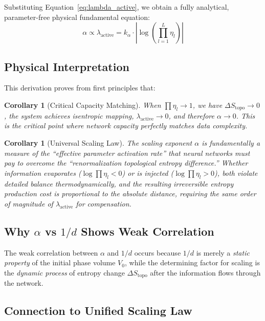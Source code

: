 \documentclass[11pt, a4paper]{article}
\newtheorem{coro}[theo]{Corollary}
\theoremstyle{plain}
\begin{document}
Substituting Equation~\eqref{eq:lambda_active}, we obtain a fully analytical, parameter-free physical fundamental equation:
\begin{equation}
\boxed{
\alpha \propto \lambda_{\text{active}} = k_\alpha \cdot \left| \log\left(\prod_{l=1}^{L} \eta_l\right) \right|
}
\end{equation}

\subsection{Physical Interpretation}

This derivation proves from first principles that:

\begin{coro}[Critical Capacity Matching]
When $\prod\eta_l \to 1$, we have $\Delta S_{\text{topo}} \to 0$, the system achieves isentropic mapping, $\lambda_{\text{active}} \to 0$, and therefore $\alpha \to 0$. This is the \emph{critical point} where network capacity perfectly matches data complexity.
\end{coro}

\begin{coro}[Universal Scaling Law]
The scaling exponent $\alpha$ is fundamentally a measure of the ``effective parameter activation rate'' that neural networks must pay to overcome the ``renormalization topological entropy difference.'' Whether information evaporates ($\log\prod\eta_l < 0$) or is injected ($\log\prod\eta_l > 0$), both violate detailed balance thermodynamically, and the resulting irreversible entropy production cost is proportional to the absolute distance, requiring the same order of magnitude of $\lambda_{\text{active}}$ for compensation.
\end{coro}

\subsection{Why $\alpha$ vs $1/d$ Shows Weak Correlation}

The weak correlation between $\alpha$ and $1/d$ occurs because $1/d$ is merely a \emph{static property} of the initial phase volume $V_0$, while the determining factor for scaling is the \emph{dynamic process} of entropy change $\Delta S_{\text{topo}}$ after the information flows through the network.

\subsection{Connection to Unified Scaling Law}
\end{document}
